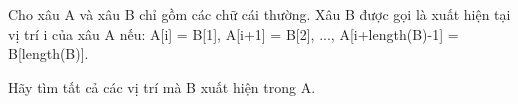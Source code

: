 Cho xâu A và xâu B chỉ gồm các chữ cái thường. Xâu B được gọi là xuất hiện tại vị trí i của xâu A nếu: A[i] = B[1], A[i+1] = B[2], ..., A[i+length(B)-1] = B[length(B)].

Hãy tìm tất cả các vị trí mà B xuất hiện trong A.

\